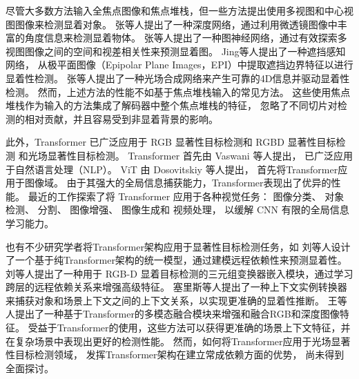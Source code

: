 尽管大多数方法输入全焦点图像和焦点堆栈，但一些方法提出使用多视图和中心视图图像来检测显着对象。 
张等人提出了一种深度网络，通过利用微透镜图像中丰富的角度信息来检测显着物体。 
张等人提出了一种图神经网络，通过有效探索多视图图像之间的空间和视差相关性来预测显着图。 
Jing等人提出了一种遮挡感知网络，
从极平面图像（Epipolar Plane Images，EPI）中提取遮挡边界特征以进行显着性检测。 
张等人提出了一种光场合成网络来产生可靠的4D信息并驱动显着性检测。 
然而，上述方法的性能不如基于焦点堆栈输入的常见方法。 
这些使用焦点堆栈作为输入的方法集成了解码器中整个焦点堆栈的特征，
忽略了不同切片对检测的相对贡献，并且容易受到非显着背景的影响。 





此外，Transformer 已广泛应用于 
RGB 显著性目标检测和 
RGBD 显著性目标检测
和光场显著性目标检测。
Transformer 首先由 Vaswani 等人提出，
已广泛应用于自然语言处理（NLP）。
ViT 由 Dosovitskiy 等人提出，
首先将Transformer应用于图像域。
由于其强大的全局信息捕获能力，Transformer表现出了优异的性能。
最近的工作探索了将 Transformer 应用于各种视觉任务：
图像分类、
对象检测、
分割、
图像增强、
图像生成和 
视频处理，
以缓解 CNN 有限的全局信息学习能力。



也有不少研究学者将Transformer架构应用于显著性目标检测任务，如
刘等人设计了一个基于纯Transformer架构的统一模型，通过建模远程依赖性来预测显着性。
刘等人提出了一种用于 RGB-D 显着目标检测的三元组变换器嵌入模块，通过学习跨层的远程依赖关系来增强高级特征。 
塞里斯等人提出了一种上下文实例转换器来捕获对象和场景上下文之间的上下文关系，以实现更准确的显着性推断。 
王等人提出了一种基于Transformer的多模态融合模块来增强和融合RGB和深度图像特征。
受益于Transformer的使用，这些方法可以获得更准确的场景上下文特征，并在复杂场景中表现出更好的检测性能。 然而，如何将Transformer应用于光场显著性目标检测领域，
发挥Transformer架构在建立常成依赖方面的优势，
尚未得到全面探讨。 






